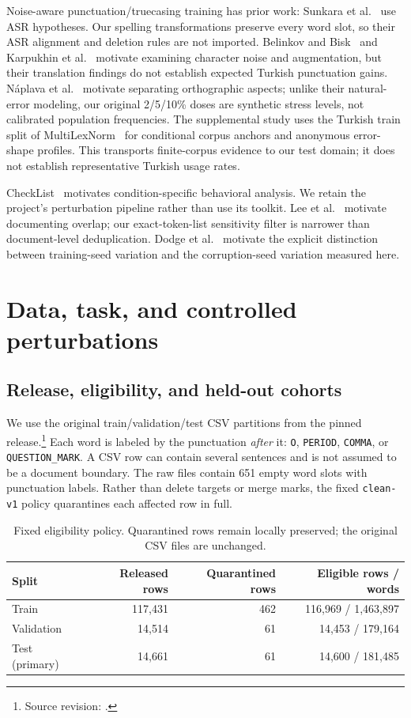 \documentclass{article}
\begin{document}
Noise-aware punctuation/truecasing training has prior work: Sunkara et
al.~\cite{sunkara2020} use ASR hypotheses. Our spelling transformations preserve
every word slot, so their ASR alignment and deletion rules are not imported.
Belinkov and Bisk~\cite{belinkov2018} and Karpukhin et al.~\cite{karpukhin2019}
motivate examining character noise and augmentation, but their translation
findings do not establish expected Turkish punctuation gains. N\'{a}plava et
al.~\cite{naplava2021} motivate separating orthographic aspects; unlike their
natural-error modeling, our original 2/5/10\% doses are synthetic stress levels,
not calibrated population frequencies. The supplemental study uses the Turkish
train split of MultiLexNorm~\cite{multilexnorm2021} for conditional corpus anchors
and anonymous error-shape profiles. This transports finite-corpus evidence to
our test domain; it does not establish representative Turkish usage rates.

CheckList~\cite{ribeiro2020} motivates condition-specific behavioral analysis.
We retain the project's perturbation pipeline rather than use its toolkit.
Lee et al.~\cite{lee2022} motivate documenting overlap; our exact-token-list
sensitivity filter is narrower than document-level deduplication. Dodge et
al.~\cite{dodge2020} motivate the explicit distinction between training-seed
variation and the corruption-seed variation measured here.

\section{Data, task, and controlled perturbations}
\subsection{Release, eligibility, and held-out cohorts}
We use the original train/validation/test CSV partitions from the pinned
release.\footnote{Source revision: .}
Each word is labeled by the
punctuation \emph{after} it: \texttt{O}, \texttt{PERIOD}, \texttt{COMMA}, or
\texttt{QUESTION\_MARK}. A CSV row can contain several sentences and is not
assumed to be a document boundary. The raw files contain 651 empty word slots
with punctuation labels. Rather than delete targets or merge marks, the fixed
\texttt{clean-v1} policy quarantines each affected row in full.

\begin{table}[htbp]
\centering
\caption{Fixed eligibility policy. Quarantined rows remain locally preserved;
the original CSV files are unchanged.}
\label{tab:data}
\begin{tabular}{lrrr}
\toprule
Split & Released rows & Quarantined rows & Eligible rows / words\\
\midrule
Train & 117,431 & 462 & 116,969 / 1,463,897\\
Validation & 14,514 & 61 & 14,453 / 179,164\\
Test (primary) & 14,661 & 61 & 14,600 / 181,485\\
\bottomrule
\end{tabular}
\end{table}
\end{document}
